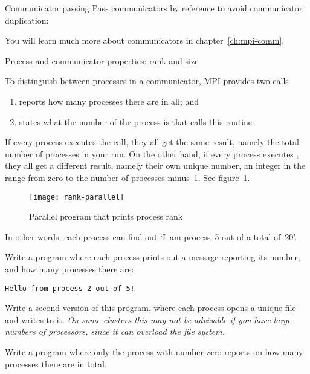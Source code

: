 \begin{mplnote}{Communicator passing}
  Pass communicators by reference to avoid communicator duplication:
\end{mplnote}

You will
learn much more about communicators in chapter~\ref{ch:mpi-comm}.

 {Process and communicator properties: rank and size}

To distinguish between processes in a communicator, MPI provides two calls
\begin{enumerate}
\item {} reports how many processes there are in all; and
\item {} states what the number of the
  process is that calls this routine.
\end{enumerate}

If every process executes the  call, they all get the
same result, namely the total number of processes in your run.
%
On the
other hand, if every process executes , they all get
a different result, namely their own unique number, an integer in the
range from zero to the number of processes minus~1.
See figure~\ref{fig:rank-parallel}.
%
\begin{figure}[ht]
  \texttt{[image: rank-parallel]}
  \caption{Parallel program that prints process rank}
  \label{fig:rank-parallel}
\end{figure}
%
In other words, each process can find out `I~am process~5
out of a total of~20'.


\begin{exercise}
  \label{ex:hello3}
  Write a program where each process prints out a message
  reporting its number, and how many processes there are:
\begin{verbatim}
Hello from process 2 out of 5!
\end{verbatim}

  Write a second version of this program, where each process opens a
  unique file and writes to it. \emph{On some clusters this may not be
    advisable if you have large numbers of processors, since it can
    overload the file system.}
\end{exercise}

\begin{exercise}
  \label{ex:hello4}
  Write a program where only the process with number zero
  reports on how many processes there are in total.
\end{exercise}


